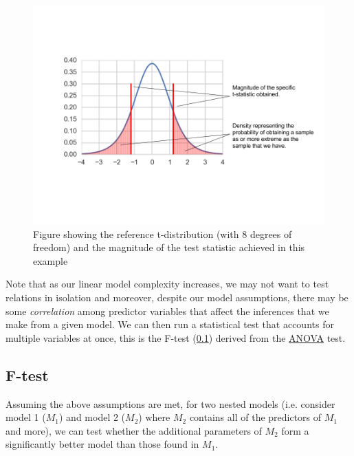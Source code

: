 \documentclass{article}
\begin{document}
\begin{figure}[h]
\center
\includegraphics[width=15cm]{t_dist}
\caption{Figure showing the reference t-distribution (with 8 degrees of freedom) and the magnitude of the test statistic achieved in this example}\label{fig:t-dist}
\end{figure}

Note that as our linear model complexity increases, we may not want to test relations in isolation and moreover, despite our model assumptions, there may be some \textit{correlation} among predictor variables that affect the inferences that we make from a given model. We can then run a statistical test that accounts for multiple variables at once, this is the F-test (\ref{f-test}) derived from the \href{https://en.wikipedia.org/wiki/Analysis_of_variance}{ANOVA} test.

\newpage
\subsection{F-test}\label{f-test}
Assuming the above assumptions are met, for two nested models (i.e. consider model 1 ($M_1$) and model 2 ($M_2$) where $M_2$ contains all of the predictors of $M_1$ and more), we can test whether the additional parameters of $M_2$ form a significantly better model than those found in $M_1$.

\noindent{}
\end{document}
